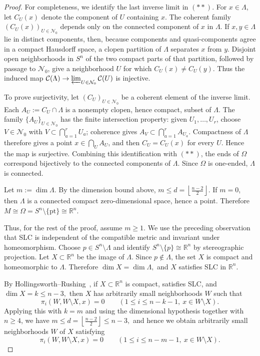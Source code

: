 \documentclass[12pt,oneside,a4paper]{article}
\theoremstyle{mytheorem}
\theoremstyle{remark}
\theoremstyle{definition}
\begin{document}
\begin{proof}
For completeness, we identify the last inverse limit in \((**)\). For
\(x\in\Lambda\), let \(C_U(x)\) denote the component of \(U\) containing
\(x\). The coherent family \((C_U(x))_{U\in\mathcal N_0}\) depends only on
the connected component of \(x\) in \(\Lambda\). If \(x,y\in\Lambda\) lie
in distinct components, then, because components and quasi-components agree
in a compact Hausdorff space, a clopen partition of \(\Lambda\) separates
\(x\) from \(y\). Disjoint open neighborhoods in \(S^n\) of the two compact
parts of that partition, followed by passage to \(\mathcal N_0\), give a
neighborhood \(U\) for which \(C_U(x)\neq C_U(y)\). Thus the induced map
\(\mathcal C(\Lambda)\to
\varprojlim_{U\in\mathcal N_0}\mathcal C(U)\)
is injective.

To prove surjectivity, let \((C_U)_{U\in\mathcal N_0}\) be a coherent
element of the inverse limit. Each
\(A_U:=C_U\cap\Lambda\) is a nonempty clopen, hence compact, subset of
\(\Lambda\). The family \(\{A_U\}_{U\in\mathcal N_0}\) has the finite
intersection property: given \(U_1,\dots,U_r\), choose
\(V\in\mathcal N_0\) with \(V\subset\bigcap_{a=1}^r U_a\); coherence gives
\(A_V\subset\bigcap_{a=1}^r A_{U_a}\). Compactness of \(\Lambda\) therefore
gives a point \(x\in\bigcap_U A_U\), and then \(C_U=C_U(x)\) for every
\(U\). Hence the map is surjective. Combining this identification with
\((**)\), the ends of \(\Omega\) correspond bijectively to the connected
components of \(\Lambda\). Since \(\Omega\) is one-ended, \(\Lambda\) is
connected.

Let \(m:=\dim\Lambda\).
By the dimension bound above, \(m\leq d=\left\lfloor\frac{n-2}{2}\right\rfloor\).
If \(m=0\), then \(\Lambda\) is a connected compact zero-dimensional space,
hence a point. Therefore $M\cong\Omega=S^n\setminus\{\mathrm{pt}\}\cong \mathbb R^n.$

Thus, for the rest of the proof, assume \(m\geq1\). We use the preceding
observation that SLC is independent of the compatible metric and invariant
under homeomorphism. Choose \(p\in S^n\setminus\Lambda\) and identify $S^n\setminus\{p\}\cong \mathbb R^n$
by stereographic projection. Let \(X\subset\mathbb R^n\) be the image of
\(\Lambda\). Since \(p\notin\Lambda\), the set \(X\) is compact and
homeomorphic to \(\Lambda\). Therefore $\dim X=\dim\Lambda,$
and \(X\) satisfies SLC in \(\mathbb R^n\).

By Hollingsworth--Rushing~\cite[Lemma~1, p.~105]{zbMATH03513016}, if \(X\subset\mathbb R^n\) is compact, satisfies SLC, and $\dim X=k\le n-3,$
then \(X\) has arbitrarily small neighborhoods \(W\) such that
\[
\pi_i(W,W\setminus X,x)=0
\qquad
(1\le i\le n-k-1,\ x\in W\setminus X).
\]
Applying this with \(k=m\) and using the dimensional hypothesis together with $n\geq 4$, we have
$m\le d=\left\lfloor\frac{n-2}{2}\right\rfloor\le n-3,$
and hence we obtain arbitrarily small neighborhoods \(W\) of \(X\) satisfying
\[
\pi_i(W,W\setminus X,x)=0
\qquad
(1\le i\le n-m-1,\ x\in W\setminus X).
\]


\end{proof}
\end{document}
